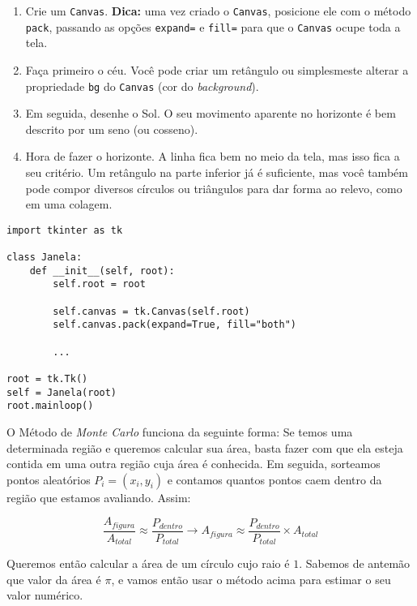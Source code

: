 \documentclass[12pt]{article}
\begin{document}
	\begin{enumerate}
		\item Crie um \texttt{Canvas}. \textbf{Dica:} uma vez criado o \texttt{Canvas}, posicione ele com o método \texttt{pack}, passando as opções \texttt{expand=} e \texttt{fill=} para que o \texttt{Canvas} ocupe toda a tela.
		\item Faça primeiro o céu. Você pode criar um retângulo ou simplesmeste alterar a propriedade \texttt{bg} do \texttt{Canvas} (cor do \textit{background}).
		
		\item Em seguida, desenhe o Sol. O seu movimento aparente no horizonte é bem descrito por um seno (ou cosseno).
		
		\item Hora de fazer o horizonte. A linha fica bem no meio da tela, mas isso fica a seu critério. Um retângulo na parte inferior já é suficiente, mas você também pode compor diversos círculos ou triângulos para dar forma ao relevo, como em uma colagem.
		
	\end{enumerate}

	\begin{lstlisting}
import tkinter as tk

class Janela:
	def __init__(self, root):
		self.root = root
		
		self.canvas = tk.Canvas(self.root)
		self.canvas.pack(expand=True, fill="both")
		
		...
		
root = tk.Tk()
self = Janela(root)
root.mainloop()
	\end{lstlisting}

	
	O Método de \emph{Monte Carlo} funciona da seguinte forma: Se temos uma determinada região e queremos calcular sua área, basta fazer com que ela esteja contida em uma outra região cuja área é conhecida. Em seguida, sorteamos pontos aleatórios $P_{i} = (x_{i}, y_{i})$ e contamos quantos pontos caem dentro da região que estamos avaliando. Assim:
	
	$$ \frac{A_{figura}}{A_{total}} \approx \frac{P_{dentro}}{P_{total}} \to A_{figura} \approx \frac{P_{dentro}}{P_{total}} \times A_{total} $$

	Queremos então calcular a área de um círculo cujo raio é $1$. Sabemos de antemão que valor da área é $\pi$, e vamos então usar o método acima para estimar o seu valor numérico.\\
\end{document}
